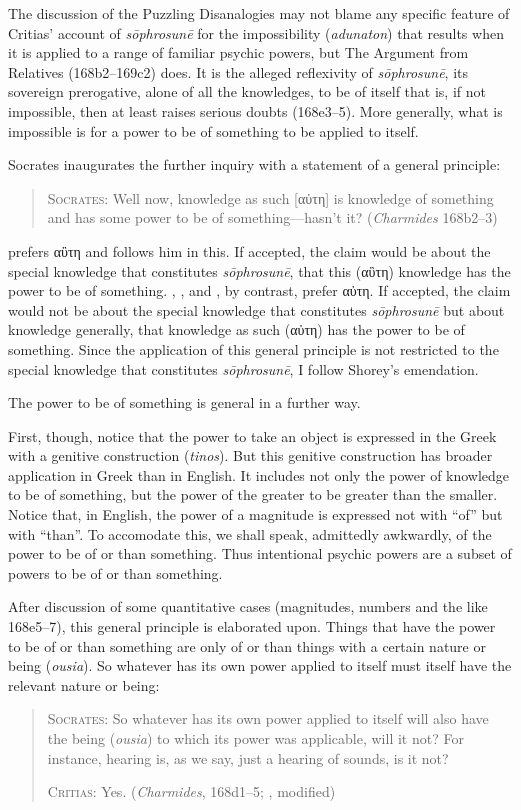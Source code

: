 The discussion of the Puzzling Disanalogies may not blame any specific feature of Critias' account of \emph{sōphrosunē} for the impossibility (\emph{adunaton}) that results when it is applied to a range of familiar psychic powers, but The Argument from Relatives (168b2–169c2) does. It is the alleged reflexivity of \emph{sōphrosunē}, its sovereign prerogative, alone of all the knowledges, to be of itself that is, if not impossible, then at least raises serious doubts (168e3–5). More generally, what is impossible is for a power to be of something to be applied to itself.

Socrates inaugurates the further inquiry with a statement of a general principle:
\begin{quote}
	\textsc{Socrates}: Well now, knowledge as such [{\sbl αὐτη}] is knowledge of something and has some power to be of something—hasn't it? (\emph{Charmides} 168b2–3)
\end{quote}
\citet{Burnet:1903aa} prefers {\sbl αὒτη} and \citet[60]{Lamb:1927qw} follows him in this. If accepted, the claim would be about the special knowledge that constitutes \emph{sōphrosunē}, that this ({\sbl αὒτη}) knowledge has the power to be of something. \citet{Shorey:1907ys}, \citet[55]{Ben:1985aa}, and \citet[220 n23]{Tuozzo:2011aa}, by contrast, prefer {\sbl αὐτη}. If accepted, the claim would not be about the special knowledge that constitutes \emph{sōphrosunē} but about knowledge generally, that knowledge as such ({\sbl αὐτη}) has the power to be of something. Since the application of this general principle is not restricted to the special knowledge that constitutes \emph{sōphrosunē}, I follow Shorey's emendation.

The power to be of something is general in a further way.

First, though, notice that the power to take an object is expressed in the Greek with a genitive construction (\emph{tinos}). But this genitive construction has broader application in Greek than in English. It includes not only the power of knowledge to be of something, but the power of the greater to be greater than the smaller. Notice that, in English, the power of a magnitude is expressed not with ``of'' but with ``than''. To accomodate this, we shall speak, admittedly awkwardly, of the power to be of or than something. Thus intentional psychic powers are a subset of powers to be of or than something.

After discussion of some quantitative cases (magnitudes, numbers and the like 168e5–7), this general principle is elaborated upon. Things that have the power to be of or than something are only of or than things with a certain nature or being (\emph{ousia}). So whatever has its own power applied to itself must itself have the relevant nature or being:
\begin{quotation}
	\textsc{Socrates}: So whatever has its own power applied to itself will also have the being (\emph{ousia}) to which its power was applicable, will it not? For instance, hearing is, as we say, just a hearing of sounds, is it not?
	
	\textsc{Critias}: Yes. (\emph{Charmides}, 168d1–5; \citealt[63]{Lamb:1927qw}, modified)
\end{quotation}

